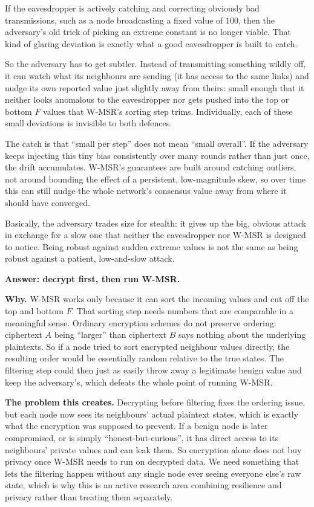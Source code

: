 \documentclass[a4paper, 11pt]{article}
\begin{document}
\begin{solution}
If the eavesdropper is actively catching and correcting obviously bad transmissions, such as a node broadcasting a fixed value of $100$, then the adversary's old trick of picking an extreme constant is no longer viable. That kind of glaring deviation is exactly what a good eavesdropper is built to catch.

So the adversary has to get subtler. Instead of transmitting something wildly off, it can watch what its neighbours are sending (it has access to the same links) and nudge its own reported value just slightly away from theirs: small enough that it neither looks anomalous to the eavesdropper nor gets pushed into the top or bottom $F$ values that W-MSR's sorting step trims. Individually, each of these small deviations is invisible to both defences.

The catch is that ``small per step'' does not mean ``small overall''. If the adversary keeps injecting this tiny bias consistently over many rounds rather than just once, the drift accumulates. W-MSR's guarantees are built around catching outliers, not around bounding the effect of a persistent, low-magnitude skew, so over time this can still nudge the whole network's consensus value away from where it should have converged.

Basically, the adversary trades size for stealth: it gives up the big, obvious attack in exchange for a slow one that neither the eavesdropper nor W-MSR is designed to notice. Being robust against sudden extreme values is not the same as being robust against a patient, low-and-slow attack.

\textbf{Answer: decrypt first, then run W-MSR.}

\noindent\textbf{Why.} W-MSR works only because it can sort the incoming values and cut off the top and bottom $F$. That sorting step needs numbers that are comparable in a meaningful sense. Ordinary encryption schemes do not preserve ordering: ciphertext $A$ being ``larger'' than ciphertext $B$ says nothing about the underlying plaintexts. So if a node tried to sort encrypted neighbour values directly, the resulting order would be essentially random relative to the true states. The filtering step could then just as easily throw away a legitimate benign value and keep the adversary's, which defeats the whole point of running W-MSR.

\noindent\textbf{The problem this creates.} Decrypting before filtering fixes the ordering issue, but each node now sees its neighbours' actual plaintext states, which is exactly what the encryption was supposed to prevent. If a benign node is later compromised, or is simply ``honest-but-curious'', it has direct access to its neighbours' private values and can leak them. So encryption alone does not buy privacy once W-MSR needs to run on decrypted data. We need something that lets the filtering happen without any single node ever seeing everyone else's raw state, which is why this is an active research area combining resilience and privacy rather than treating them separately.


\end{solution}
\end{document}

